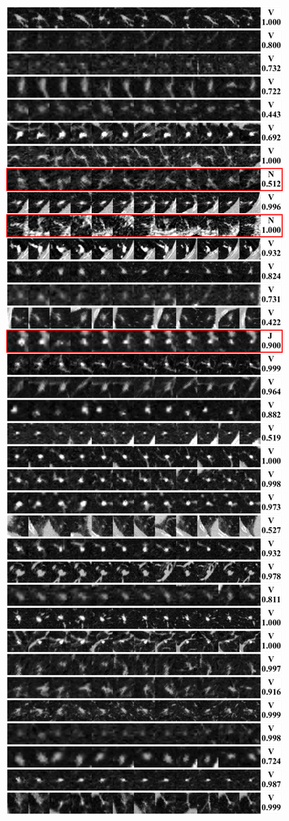 \documentclass[onecolumn]{IEEEtran}
\begin{document}
\begin{figure}[H]
{\includegraphics[width=0.45\columnwidth]{./images/elcap-msnodules-vessel3}
}
\end{figure}
\newpage
\end{document}
